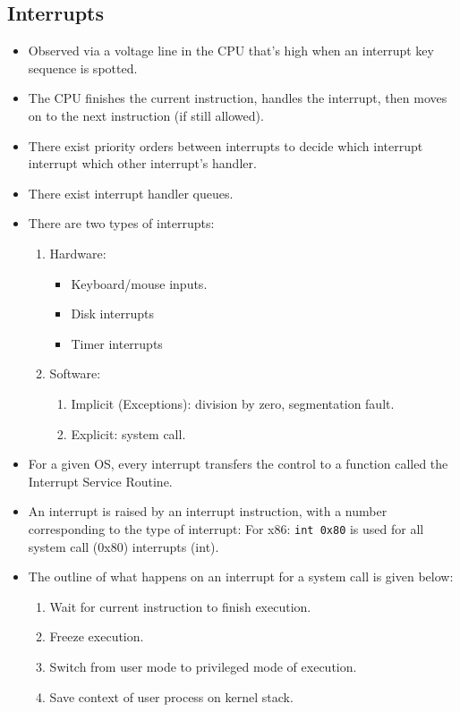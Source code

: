 \documentclass[10pt]{report}
\begin{document}
\subsection{Interrupts}
\begin{itemize}
\item Observed via a voltage line in the CPU that's high when an interrupt key sequence is spotted.
\item The CPU finishes the current instruction, handles the interrupt, then moves on to the next instruction (if still allowed).
\item There exist priority orders between interrupts to decide which interrupt interrupt which other interrupt's handler.
\item There exist interrupt handler queues.
\item There are two types of interrupts:
\begin{enumerate}
\item Hardware:
\begin{itemize}
    \item Keyboard/mouse inputs.
    \item Disk interrupts
    \item Timer interrupts
\end{itemize}
\item Software:
\begin{enumerate}
    \item Implicit (Exceptions): division by zero, segmentation fault.
    \item Explicit: system call. 
\end{enumerate}
\end{enumerate}
\item For a given OS, every interrupt transfers the control to a function called the Interrupt Service Routine.
\item An interrupt is raised by an interrupt instruction, with a number corresponding to the type of interrupt: For x86: \texttt{int 0x80} is used for all system call (0x80) interrupts (int).
\item The outline of what happens on an interrupt for a system call is given below:
\begin{enumerate}
\item Wait for current instruction to finish execution.
\item Freeze execution.
\item Switch from user mode to privileged mode of execution.
\item Save context of user process on kernel stack.

\end{enumerate}
\end{itemize}
\end{document}
